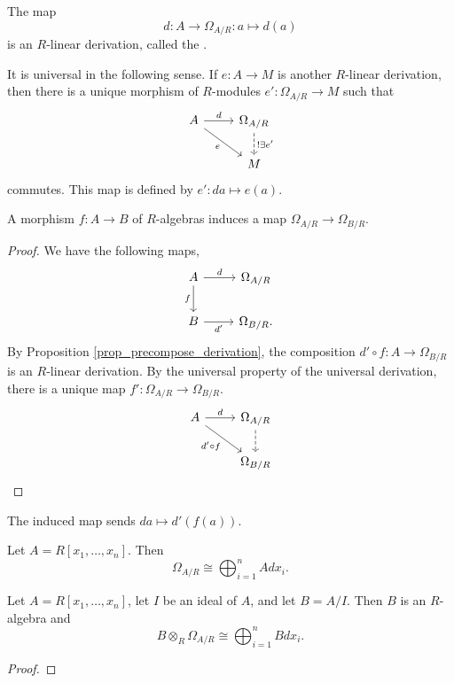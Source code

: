 \begin{definition}
  The map
    \[ d : A \to \Omega_{A/R} : a \mapsto d(a) \]
  is an $R$-linear derivation, called the .
\end{definition}

It is universal in the following sense.
If $e : A \to M$ is another $R$-linear derivation,
then there is a unique morphism of $R$-modules $e' : \Omega_{A/R} \to M$ such that
\[ \begin{tikzcd}
  A \arrow{r}{d} \arrow[swap]{dr}{e} & \Omega_{A/R} \arrow[dashed]{d}{!\exists e'} \\ & M
\end{tikzcd} \]
commutes.
This map is defined by $e' : da \mapsto e(a)$.

\begin{proposition}
  A morphism $f : A \to B$ of $R$-algebras induces a map $\Omega_{A/R} \to \Omega_{B/R}$.
\end{proposition}
\begin{proof}
  We have the following maps,
  \[ \begin{tikzcd}
      A \arrow{r}{d} \arrow[swap]{d}{f} & \Omega_{A/R} \\ B \arrow[swap]{r}{d'} & \Omega_{B/R}.
    \end{tikzcd} \]
  By Proposition \ref{prop_precompose_derivation}, the composition $d' \circ f : A \to \Omega_{B/R}$ is an $R$-linear derivation.
  By the universal property of the universal derivation, there is a unique map $f' : \Omega_{A/R} \to \Omega_{B/R}$.
  \[ \begin{tikzcd}
      A \arrow{r}{d} \arrow[swap]{dr}{d' \circ f} & \Omega_{A/R} \arrow[dashed]{d}{} \\ & \Omega_{B/R}
    \end{tikzcd} \]
\end{proof}
The induced map sends $da \mapsto d'(f(a))$.

\begin{proposition}
  Let $A = R[x_1, \ldots, x_n]$. Then
  \[ \Omega_{A/R} \cong \bigoplus_{i=1}^n Adx_i. \]
\end{proposition}
\begin{corollary}
  Let $A = R[x_1, \ldots, x_n]$, let $I$ be an ideal of $A$, and let $B = A/I$.
  Then $B$ is an $R$-algebra and
  \[ B \otimes_{R} \Omega_{A/R} \cong \bigoplus_{i=1}^n Bdx_i. \]
\end{corollary}
\begin{proof}
\end{proof}

